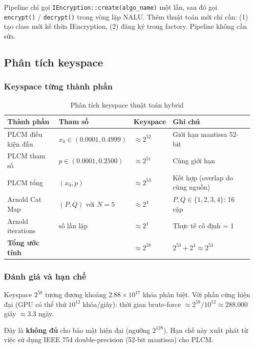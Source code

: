 Pipeline chỉ gọi \texttt{IEncryption::create(algo\_name)} một lần, sau đó
gọi \texttt{encrypt()} / \texttt{decrypt()} trong vòng lặp NALU. Thêm thuật toán
mới chỉ cần: (1) tạo class mới kế thừa IEncryption, (2) đăng ký trong factory.
Pipeline không cần sửa.

\subsection{Phân tích keyspace}

\subsubsection{Keyspace từng thành phần}

\begin{table}[ht]
\centering
\caption{Phân tích keyspace thuật toán hybrid}
\label{tab:keyspace}
\begin{tabular}{llll}
\toprule
Thành phần & Tham số & Keyspace & Ghi chú \\
\midrule
PLCM điều kiện đầu & $x_0 \in (0.0001, 0.4999)$ & $\approx 2^{52}$ & Giới hạn mantissa 52-bit \\
PLCM tham số & $p \in (0.0001, 0.2500)$ & $\approx 2^{51}$ & Cùng giới hạn \\
PLCM tổng & $(x_0, p)$ & $\approx 2^{53}$ & Kết hợp (overlap do cùng nguồn) \\
Arnold Cat Map & $(P, Q)$ với $N=5$ & $\approx 2^{4}$ & $P, Q \in \{1,2,3,4\}$: 16 cặp \\
Arnold iterations & số lần lặp & $\approx 2^{1}$ & Thực tế cố định = 1 \\
\midrule
\textbf{Tổng ước tính} & & $\approx 2^{58}$ & $2^{53} + 2^{4} \approx 2^{53}$ \\
\bottomrule
\end{tabular}
\end{table}

\subsubsection{Đánh giá và hạn chế}

Keyspace $2^{58}$ tương đương khoảng $2.88 \times 10^{17}$ khóa phân biệt.
Với phần cứng hiện đại (GPU có thể thử $10^{12}$ khóa/giây):
thời gian brute-force $\approx 2^{58} / 10^{12} \approx 288.000$ giây $\approx 3.3$ ngày.

Đây là \textbf{không đủ} cho bảo mật hiện đại (ngưỡng $2^{128}$). Hạn chế này
xuất phát từ việc sử dụng IEEE 754 double-precision (52-bit mantissa) cho PLCM.

